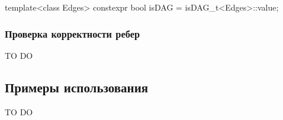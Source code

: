 \documentclass{article}
\begin{document}
{\begin{cppcode}[\nonumbers]
template<class Edges>
constexpr bool isDAG = isDAG_t<Edges>::value;
\end{cppcode}

\subsubsection{Проверка корректности ребер}

TO DO
\begin{cppcode}[\nonumbers]

\end{cppcode}


\subsection{Примеры использования}

TO DO

}
\end{document}
